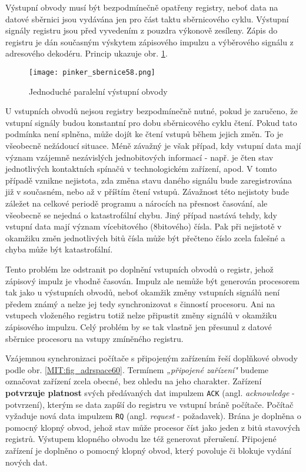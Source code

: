       Výstupní obvody musí být bezpodmínečně opatřeny registry, neboť data na datové sběrnici jsou 
      vydávána jen pro část taktu sběrnicového cyklu. Výstupní signály registru jsou před vyvedením 
      z pouzdra výkonově zesíleny. Zápis do registru je dán současným výskytem zápisového impulzu 
       a výběrového signálu z adresového dekodéru. Princip ukazuje obr. 
      \ref{MIT:fig_sbernice58}.
      
      \begin{figure}[ht!] %
        \centering
        \texttt{[image: pinker\_sbernice58.png]}
        \caption{Jednoduché paralelní výstupní obvody}
        \label{MIT:fig_sbernice58}
      \end{figure}
      
      U vstupních obvodů nejsou registry bezpodmínečně nutné, pokud je zaručeno, že vstupní signály 
      budou konstantní pro dobu sběrnicového cyklu čtení. Pokud tato podmínka není splněna, může 
      dojít ke čtení vstupů během jejich změn. To je všeobecně nežádoucí situace. Méně závažný je 
      však případ, kdy vstupní data mají význam vzájemně nezávislých jednobitových informací - 
      např. je čten stav jednotlivých kontaktních spínačů v technologickém zařízení, apod. V tomto 
      případě vznikne nejistota, zda změna stavu daného signálu bude zaregistrována již v 
      současném, nebo až v příštím čtení vstupů. Závažnost této nejistoty bude záležet na celkové 
      periodě programu a nárocích na přesnost časování, ale všeobecně se nejedná o katastrofální 
      chybu. Jiný případ nastává tehdy, kdy vstupní data mají význam vícebitového (8bitového) 
      čísla. Pak při nejistotě v okamžiku změn jednotlivých bitů čísla může být přečteno číslo 
      zcela falešné a chyba může být katastrofální.
      
      Tento problém lze odstranit po doplnění vstupních obvodů o registr, jehož zápisový impulz je 
      vhodně časován. Impulz ale nemůže být generován procesorem tak jako u výstupních obvodů, 
      neboť okamžik změny vstupních signálů není předem známý a nelze jej tedy synchronizovat s 
      činností procesoru. Ani na vstupech vloženého registru totiž nelze připustit změny signálů v 
      okamžiku zápisového impulzu. Celý problém by se tak vlastně jen přesunul z datové sběrnice 
      procesoru na vstupy zmíněného registru.
      
      Vzájemnou synchronizaci počítače s připojeným zařízením řeší doplňkové obvody podle obr. 
      \ref{MIT:fig_adrspace60}. Termínem \emph{„připojené zařízení"} budeme označovat zařízení 
      zcela obecné, bez ohledu na jeho charakter. Zařízení \textbf{potvrzuje platnost} svých 
      předávaných dat impulzem \texttt{ACK} (angl. \emph{acknowledge} - potvrzení), kterým se data 
      zapíší do registru ve vstupní bráně počítače. Počítač vyžaduje nová data impulzem \texttt{RQ} 
      (angl. \emph{request} - požadavek). Brána je doplněna o pomocný klopný obvod, jehož stav může 
      procesor číst jako jeden z bitů stavových registrů. Výstupem klopného obvodu lze též 
      generovat přerušení. Připojené zařízení je doplněno o pomocný klopný obvod, který povoluje či 
      blokuje vydání nových dat.

